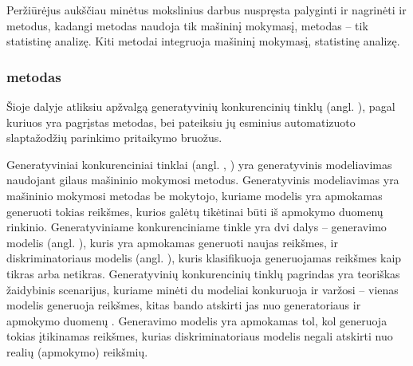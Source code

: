 \documentclass{VUMIFInfBakalaurinis}
\begin{document}
Peržiūrėjus aukščiau minėtus mokslinius darbus nuspręsta palyginti ir nagrinėti 
 ir  metodus, kadangi  
metodas naudoja tik mašininį mokymasį,  metodas -- tik 
statistinę analizę. Kiti metodai integruoja mašininį mokymasį, statistinę 
analizę.



\subsubsection{ metodas}
Šioje dalyje atliksiu apžvalgą generatyvinių konkurencinių tinklų (angl. 
), pagal kuriuos yra pagrįstas 
 metodas, bei pateiksiu jų esminius automatizuoto 
slaptažodžių parinkimo pritaikymo bruožus.

Generatyviniai konkurenciniai tinklai (angl. , ) yra generatyvinis modeliavimas naudojant gilaus 
mašininio mokymosi metodus. Generatyvinis modeliavimas yra mašininio mokymosi 
metodas be mokytojo, kuriame modelis yra apmokamas generuoti tokias reikšmes, 
kurios galėtų tikėtinai būti iš apmokymo duomenų rinkinio. Generatyviniame 
konkurenciniame tinkle yra dvi dalys -- generavimo modelis (angl. 
), kuris yra apmokamas generuoti naujas reikšmes, ir 
diskriminatoriaus modelis (angl. ), kuris 
klasifikuoja generuojamas reikšmes kaip tikras arba netikras. Generatyvinių 
konkurencinių tinklų pagrindas yra teoriškas žaidybinis scenarijus, kuriame 
minėti du modeliai konkuruoja ir varžosi -- vienas modelis generuoja reikšmes, 
kitas bando atskirti jas nuo generatoriaus ir apmokymo duomenų \cite{DL}. 
Generavimo modelis yra apmokamas tol, kol generuoja tokias įtikinamas reikšmes, 
kurias diskriminatoriaus modelis negali atskirti nuo realių (apmokymo) reikšmių.
\end{document}
